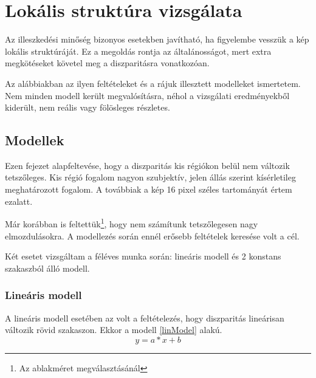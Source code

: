 \chapter{Lokális struktúra vizsgálata}\label{sect:LocalStruct}

Az illeszkedési minőség bizonyos esetekben javítható, ha figyelembe vesszük a kép lokális struktúráját.
Ez a megoldás rontja az általánosságot, mert extra megkötéseket követel meg a diszparitásra vonatkozóan.

Az alábbiakban az ilyen feltételeket és a rájuk illesztett modelleket ismertetem.
Nem minden modell került megvalósításra, néhol a vizsgálati eredményekből kiderült, nem reális vagy fölösleges részletes.

\section{Modellek}\label{sect:Models}

Ezen fejezet alapfeltevése, hogy a diszparitás kis régiókon belül nem változik tetszőleges.
Kis régió fogalom nagyon szubjektív, jelen állás szerint kísérletileg meghatározott fogalom.
A továbbiak a kép 16 pixel széles tartományát értem ezalatt.

Már korábban is feltettük\footnote{Az ablakméret megválasztásánál}, hogy nem számítunk tetszőlegesen nagy elmozdulásokra.
A modellezés során ennél erősebb feltételek keresése volt a cél.

Két esetet vizsgáltam a féléves munka során: lineáris modell és 2 konstans szakaszból álló modell.

\subsection{Lineáris modell}\label{sect:linearModel}

A lineáris modell esetében az volt a feltételezés, hogy diszparitás lineárisan változik rövid szakaszon.
Ekkor a modell \eqref{linModel} alakú.
\begin{equation}
y = a*x + b
\label{eq:linModel}
\end{equation}

